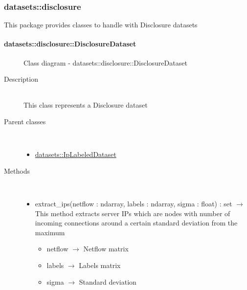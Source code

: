 \subsubsection{datasets::disclosure}
This package provides classes to handle with Disclosure datasets

\hypertarget{datasets::disclosure::DisclosureDataset}{}
\paragraph[DisclosureDataset]{datasets::disclosure::DisclosureDataset}
 \hfill\begin{figure}[h]
\centering
{}
\caption{Class diagram - datasets::disclosure::DisclosureDataset}
\end{figure}\begin{description}
\item[Description] \hfill \\
 This class represents a Disclosure dataset
\item[Parent classes] \hfill \\
 \vspace{-1cm}
\begin{itemize}
\item \hyperlink{datasets::IpLabeledDataset}{datasets::IpLabeledDataset}
\end{itemize}

\item[Methods] \hfill \\
 \vspace{-1cm}
\begin{itemize}
\item extract\_ips(netflow : ndarray, labels : ndarray, sigma : float) : set $\rightarrow$ This method extracts server IPs which are nodes with number of incoming connections around a certain standard deviation from the maximum\begin{itemize}
\item netflow $\rightarrow$ Netflow matrix
\item labels $\rightarrow$ Labels matrix
\item sigma $\rightarrow$ Standard deviation
\end{itemize}

\end{itemize}

\end{description}
\hypertarget{datasets::disclosure::DisclosureDatasetBuilder}{}
